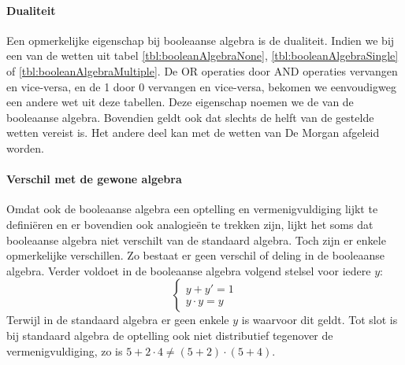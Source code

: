 \paragraph{Dualiteit}Een opmerkelijke eigenschap bij booleaanse algebra is de dualiteit. Indien we bij een van de wetten uit tabel \ref{tbl:booleanAlgebraNone}, \ref{tbl:booleanAlgebraSingle} of \ref{tbl:booleanAlgebraMultiple}. De OR operaties door AND operaties vervangen en vice-versa, en de 1 door 0 vervangen en vice-versa, bekomen we eenvoudigweg een andere wet uit deze tabellen. Deze eigenschap noemen we de  van de booleaanse algebra. Bovendien geldt ook dat slechts de helft van de gestelde wetten vereist is. Het andere deel kan met de wetten van De Morgan afgeleid worden.
\paragraph{Verschil met de gewone algebra}Omdat ook de booleaanse algebra een optelling en vermenigvuldiging lijkt te defini\"eren en er bovendien ook analogie\"en te trekken zijn, lijkt het soms dat booleaanse algebra niet verschilt van de standaard algebra. Toch zijn er enkele opmerkelijke verschillen. Zo bestaat er geen verschil of deling in de booleaanse algebra. Verder voldoet in de booleaanse algebra volgend stelsel voor iedere $y$:
\begin{equation}
\left\{\begin{array}{l}
y+y'=1\\
y\cdot y=y
\end{array}\right.
\end{equation}
Terwijl in de standaard algebra er geen enkele $y$ is waarvoor dit geldt. Tot slot is bij standaard algebra de optelling ook niet distributief tegenover de vermenigvuldiging, zo is $5+2\cdot4\neq(5+2)\cdot(5+4)$.
